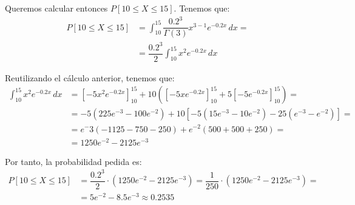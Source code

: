 \begin{ejercicio}
\begin{enumerate}
        Queremos calcular entonces $P[10\leq X\leq 15]$. Tenemos que:
        \begin{align*}
            P[10\leq X\leq 15] &= \int_{10}^{15} \dfrac{0.2^3}{\Gamma(3)} x^{3-1} e^{-0.2x} \, dx =\\&= \dfrac{0.2^3}{2} \int_{10}^{15} x^2 e^{-0.2x} \, dx
        \end{align*}

        Reutilizando el cálculo anterior, tenemos que:
        \begin{align*}
            \int_{10}^{15} x^2 e^{-0.2x} \, dx &=
            \left[-5x^2e^{-0.2x}\right]_{10}^{15} + 10\left(\left[-5xe^{-0.2x}\right]_{10}^{15} + 5\left[-5e^{-0.2x}\right]_{10}^{15}\right) =\\&=
            -5(225e^{-3}-100e^{-2}) + 10\left[-5(15e^{-3}-10e^{-2}) -25(e^{-3}-e^{-2})\right] =\\&=
            e^-3(-1125-750-250) + e^{-2}(500+500+250) =\\&=
            1250e^{-2} - 2125e^{-3}
        \end{align*}

        Por tanto, la probabilidad pedida es:
        \begin{align*}
            P[10\leq X\leq 15] &= \dfrac{0.2^3}{2} \cdot (1250e^{-2} - 2125e^{-3}) = \dfrac{1}{250} \cdot (1250e^{-2} - 2125e^{-3}) =\\&= 5e^{-2} - 8.5e^{-3} \approx 0.2535
        \end{align*}
    \end{enumerate}
\end{ejercicio}

